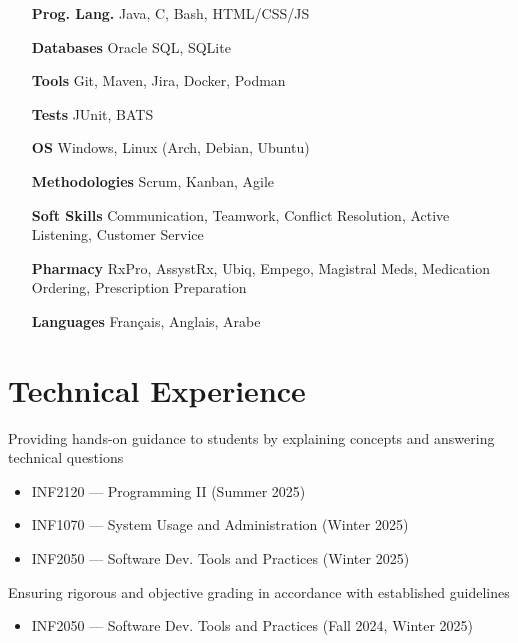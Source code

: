 \documentclass[letterpaper,10pt]{article}
\begin{document}
  \begin{multicols}{2}
    \begin{itemize}[itemsep=-2px, parsep=5pt, leftmargin=75pt]
      \item[\textbf{Prog. Lang.}] Java, C, Bash, HTML/CSS/JS
      \item[\textbf{Databases}] Oracle SQL, SQLite
      \item[\textbf{Tools}] Git, Maven, Jira, Docker, Podman
      \item[\textbf{Tests}] JUnit, BATS
      \item[\textbf{OS}]  Windows, Linux (Arch, Debian, Ubuntu)
      \item[\textbf{Methodologies}]  Scrum, Kanban, Agile
      \item[\textbf{Soft Skills}]  Communication, Teamwork, Conflict Resolution, Active Listening, Customer Service
      \item[\textbf{Pharmacy}]  RxPro, AssystRx, Ubiq, Empego, Magistral Meds, Medication Ordering, Prescription Preparation
      \item[\textbf{Languages}]  Français, Anglais, Arabe
    \end{itemize}
  \end{multicols}


  \section{Technical Experience}

  \begin{resume_list}
    \item Providing hands-on guidance to students by explaining concepts and answering technical questions
    \begin{itemize}
        \item INF2120 — Programming II (Summer 2025)
        \item INF1070 — System Usage and Administration (Winter 2025)
        \item INF2050 — Software Dev. Tools and Practices (Winter 2025)
    \end{itemize}
  \vspace{3pt}
  
    \item Ensuring rigorous and objective grading in accordance with established guidelines
    \begin{itemize}
        \item INF2050 — Software Dev. Tools and Practices (Fall 2024, Winter 2025)
    \end{itemize}
  \end{resume_list}
\end{document}
